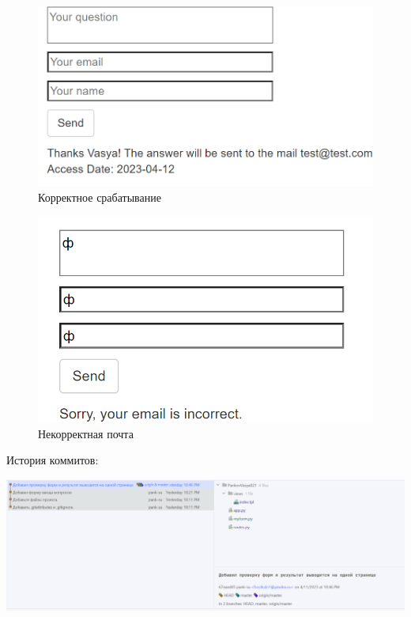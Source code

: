 \documentclass[14pt]{extarticle}
\begin{document}
\begin{figure}[H]
\centering
\includegraphics[width=.9\linewidth]{images/2023-04-12_10-23-44_screenshot.png}
\caption{Корректное срабатывание}
\end{figure}

\begin{figure}[H]
\centering
\includegraphics[width=.9\linewidth]{images/2023-04-12_10-24-31_screenshot.png}
\caption{Некорректная почта}
\end{figure}



История коммитов:
\begin{center}
\includegraphics[width=.9\linewidth]{images/2023-04-12_10-19-58_screenshot.png}
\end{center}
\end{document}
